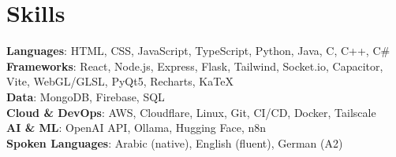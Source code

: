 \documentclass[a4paper,12pt]{article}
\makeatletter
\newcommand{\resumePOR}[3]{
\vspace{0.2mm}\item
    \begin{tabularx}{0.97\textwidth}[t]{@{}L@{\extracolsep{\fill}}r@{}}
        \textbf{#1}\hspace{0.3mm}#2 & {\small{#3}}
    \end{tabularx}
    \vspace{-2.7mm}
}
\newcommand{\resumeSubHeadingListStart}{\begin{itemize}[leftmargin=*,labelsep=0mm]}
\newcommand{\resumeItemListStart}{\begin{justify}\begin{itemize}[leftmargin=3ex, rightmargin=2ex, noitemsep,labelsep=1.2mm,itemsep=0mm]}
\newcommand{\resumeSubHeadingListEnd}{\end{itemize}\vspace{1mm}}
\newcommand{\resumeItemListEnd}{\end{itemize}\end{justify}\vspace{-2mm}}
\makeatother
\begin{document}
\vspace{-1.5mm}

\section{\textbf{Skills}}
 \begin{itemize}[leftmargin=0.05in, label={}]
    {\item{
     \textbf{Languages}{: HTML, CSS, JavaScript, TypeScript, Python, Java, C, C++, C\#} \\
     \textbf{Frameworks}{: React, Node.js, Express, Flask, Tailwind, Socket.io, Capacitor, Vite, WebGL/GLSL, PyQt5, Recharts, KaTeX} \\
     \textbf{Data}{: MongoDB, Firebase, SQL } \\
     \textbf{Cloud \& DevOps}{: AWS, Cloudflare, Linux, Git, CI/CD, Docker, Tailscale } \\
     \textbf{AI \& ML}{: OpenAI API, Ollama, Hugging Face, n8n } \\
     \textbf{Spoken Languages}{: Arabic (native), English (fluent), German (A2) }
    }}
 \end{itemize}
 \vspace{-3mm}


\end{document}
